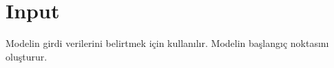 \section{Input}
Modelin girdi verilerini belirtmek için kullanılır. Modelin başlangıç noktasını oluşturur.

\newpage